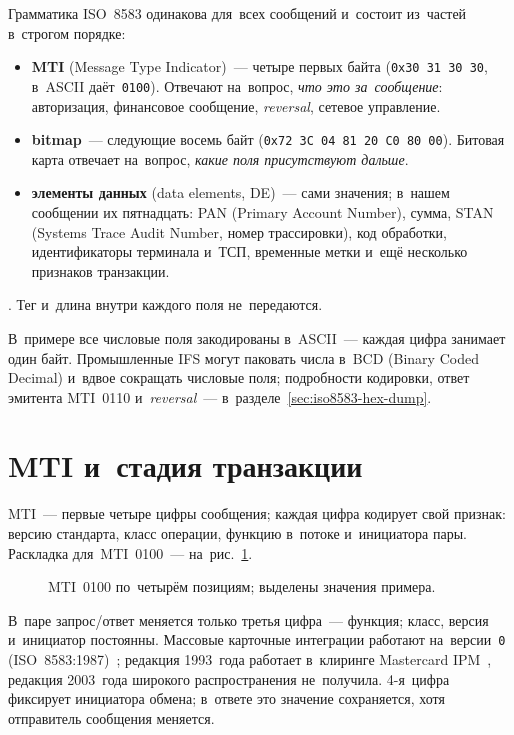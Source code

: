 Грамматика ISO~8583 одинакова для~всех сообщений и~состоит из~частей в~строгом порядке:

\begin{itemize}
  \item \textbf{MTI} (Message Type Indicator)~--- четыре первых байта
    (\texttt{0x30 31 30 30}, в~ASCII даёт~\texttt{0100}). Отвечают на~вопрос,
    \emph{что это за~сообщение}: авторизация, финансовое сообщение, \textit{reversal},
    сетевое управление.
  \item \textbf{bitmap}~--- следующие восемь байт (\texttt{0x72 3C 04 81 20 C0 80
    00}). Битовая карта отвечает на~вопрос, \emph{какие поля присутствуют
    дальше}.
  \item \textbf{элементы данных} (data elements, DE)~--- сами значения; в~нашем
    сообщении их пятнадцать: PAN (Primary Account Number), сумма, STAN (Systems Trace Audit Number,
    номер трассировки), код обработки, идентификаторы терминала и~ТСП,
    временные метки и~ещё несколько признаков транзакции.
\end{itemize}

. Тег и~длина внутри каждого поля
не~передаются.

В~примере все числовые поля закодированы в~ASCII~--- каждая цифра занимает один
байт. Промышленные IFS могут паковать числа в~BCD (Binary Coded Decimal)
и~вдвое сокращать числовые поля; подробности кодировки, ответ эмитента MTI~0110
и~\textit{reversal}~--- в~разделе~\ref{sec:iso8583-hex-dump}.

\section{MTI и~стадия транзакции}\label{sec:iso8583-mti}

MTI~--- первые четыре цифры сообщения; каждая цифра кодирует свой признак:
версию стандарта, класс операции, функцию в~потоке и~инициатора пары. Раскладка
для~MTI~0100~--- на~рис.~\ref{fig:mti-breakdown}.

\begin{figure}[tbp]
  \centering
  \caption{MTI~0100 по~четырём позициям; выделены значения примера.}\label{fig:mti-breakdown}
\end{figure}

В~паре запрос/ответ меняется только третья цифра~--- функция; класс, версия
и~инициатор постоянны. Массовые карточные интеграции работают
на~версии~\texttt{0} (ISO~8583:1987)~\cite{fis-iso8583-guide-2023}; редакция
1993~года работает в~клиринге Mastercard IPM~\cite{mc-gcms-rm-2021}, редакция
2003~года широкого распространения не~получила. 4-я~цифра фиксирует
инициатора обмена; в~ответе это значение сохраняется, хотя отправитель
сообщения меняется.

